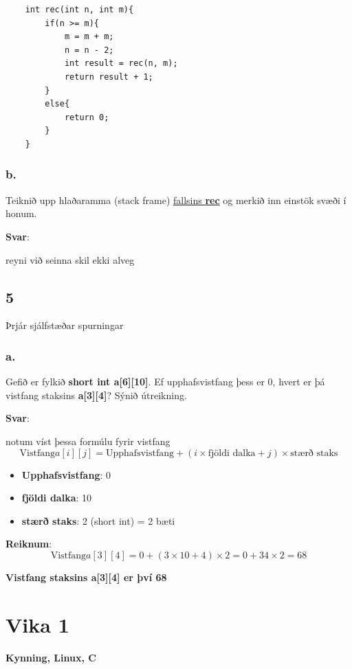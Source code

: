 \documentclass{article}
\begin{document}
\begin{lstlisting}
    int rec(int n, int m){
        if(n >= m){
            m = m + m;
            n = n - 2;
            int result = rec(n, m);
            return result + 1;
        }
        else{
            return 0;
        }
    }
\end{lstlisting}

\subsubsection{b.}Teiknið upp hlaðaramma (stack frame) \underline{fallsins \textbf{rec}} og merkið inn einstök
svæði í honum.

\textbf{Svar}:

reyni við seinna skil ekki alveg


\newpage

\subsection{5} Þrjár sjálfstæðar spurningar

\subsubsection{a.} Gefið er fylkið \textbf{short int a[6][10]}. Ef upphafsvistfang þess er 0, hvert
er þá vistfang staksins \textbf{a[3][4]}? Sýnið útreikning.

\textbf{Svar}:

notum víst þessa formúlu fyrir vistfang
\[ \text{Vistfang} a[i][j] = \text{Upphafsvistfang} + ( i \times \text{fjöldi dalka} + j) \times \text{stærð staks}\]
\begin{itemize}
    \item \textbf{Upphafsvistfang}: 0
    \item \textbf{fjöldi dalka}: 10
    \item \textbf{stærð staks}: 2 (short int) = 2 bæti
\end{itemize}

\textbf{Reiknum}:
\[ \text{Vistfang} a[3][4] = 0 + (3 \times 10 + 4) \times 2 = 0 + 34 \times 2 = 68\]

\textbf{Vistfang staksins a[3][4] er því 68}










\newpage
\section{Vika 1}
\large{\textbf{Kynning, Linux, C}}
\end{document}
